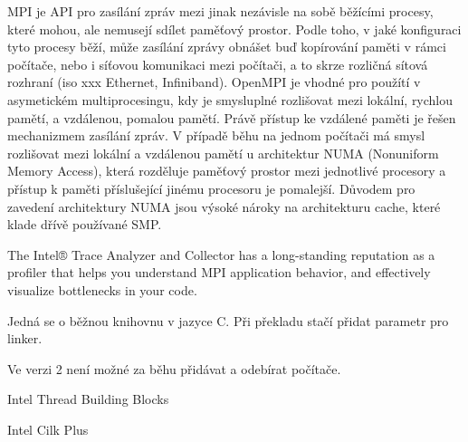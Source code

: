 MPI je API pro zasílání zpráv mezi jinak nezávisle na sobě běžícími procesy, které mohou, ale nemusejí sdílet paměťový prostor. Podle toho, v jaké konfiguraci tyto procesy běží, může zasílání zprávy obnášet buď kopírování paměti v rámci počítače, nebo i síťovou komunikaci mezi počítači, a to skrze rozličná sítová rozhraní (iso xxx Ethernet, Infiniband). OpenMPI je vhodné pro použítí v asymetickém multiprocesingu, kdy je smysluplné rozlišovat mezi lokální, rychlou pamětí, a vzdálenou, pomalou pamětí. Právě přístup ke vzdálené paměti je řešen mechanizmem zasílání zpráv. V případě běhu na jednom počítači má smysl rozlišovat mezi lokální a vzdálenou pamětí u architektur NUMA (Nonuniform Memory Access), která rozděluje paměťový prostor mezi jednotlivé procesory a přístup k paměti příslušející jinému procesoru je pomalejší. Důvodem pro zavedení architektury NUMA jsou výsoké nároky na architekturu cache, které klade dřívě používané SMP.

The Intel® Trace Analyzer and Collector has a long-standing reputation as a profiler that helps you understand MPI application behavior, and effectively visualize bottlenecks in your code. 

Jedná se o běžnou knihovnu v jazyce C. Při překladu stačí přidat parametr pro linker.

Ve verzi 2 není možné za běhu přidávat a odebírat počítače.

Intel Thread Building Blocks

Intel Cilk Plus

% 
% 
% 



